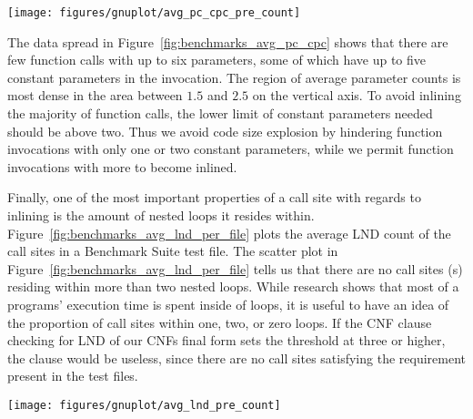 \begin{centering}
	\noindent\begin{minipage}{\textwidth}
		\captionsetup{type=figure}
		\hspace{-1em}
		\texttt{[image: figures/gnuplot/avg\_pc\_cpc\_pre\_count]}
	\end{minipage}
	\label{fig:benchmarks_avg_pc_cpc}
\end{centering}

The data spread in Figure~\ref{fig:benchmarks_avg_pc_cpc} shows that there are
few function calls with up to six parameters, some of which have up to five
constant parameters in the invocation. The region of average parameter counts is
most dense in the area between $1.5$ and $2.5$ on the vertical axis. To avoid
inlining the majority of function calls, the lower limit of constant parameters
needed should be above two. Thus we avoid code size explosion by hindering
function invocations with only one or two constant parameters, while we permit
function invocations with more to become inlined.

Finally, one of the most important properties of a call site with regards to
inlining is the amount of nested loops it resides within.
Figure~\ref{fig:benchmarks_avg_lnd_per_file} plots the average LND count of the
call sites in a Benchmark Suite test file. The scatter plot in
Figure~\ref{fig:benchmarks_avg_lnd_per_file} tells us that there are no call
sites (\applyNode s) residing within more than two nested loops. While research
shows that most of a programs' execution time is spent inside of loops, it is
useful to have an idea of the proportion of call sites within one, two, or zero
loops. If the CNF clause checking for LND of our CNFs final form sets the
threshold at three or higher, the clause would be useless, since there are no
call sites satisfying the requirement present in the test files.

\begin{centering}
	\noindent\begin{minipage}{\textwidth}
		\captionsetup{type=figure}
		\hspace{-1em}
		\texttt{[image: figures/gnuplot/avg\_lnd\_pre\_count]}
	\end{minipage}
	\label{fig:benchmarks_avg_lnd_per_file}
\end{centering}

